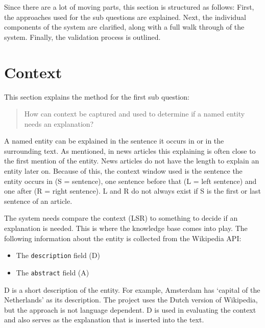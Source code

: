 \documentclass[
10pt, %
a4paper, %
oneside, %
headinclude,footinclude, %
] {book}%
\begin{document}
Since there are a lot of moving parts, this section is structured as follows:
First, the approaches used for the sub questions are explained.
Next, the individual components of the system are clarified, along with a full walk through of the system.
Finally, the validation process is outlined.

\section{Context}
This section explains the method for the first sub question:
\begin{quote}
  How can context be captured and used to determine if a named entity needs an explanation?
\end{quote}

A named entity can be explained in the sentence it occurs in or in the surrounding text.
As mentioned, in news articles this explaining is often close to the first mention of the entity.
News articles do not have the length to explain an entity later on.
Because of this, the context window used is the sentence the entity occurs in (S = sentence), one sentence before that (L = left sentence) and one after (R = right sentence).
L and R do not always exist if S is the first or last sentence of an article.

The system needs compare the context (LSR) to something to decide if an explanation is needed.
This is where the knowledge base comes into play.
The following information about the entity is collected from the Wikipedia API:
\begin{multicols}{2}
  \begin{itemize}
    \item The \verb+description+ field (D)
    \item The \verb+abstract+ field (A)
  \end{itemize}
\end{multicols}

D is a short description of the entity.
For example, Amsterdam has `capital of the Netherlands' as its description.
The project uses the Dutch version of Wikipedia, but the approach is not language dependent.
D is used in evaluating the context and also serves as the explanation that is inserted into the text.
\end{document}
